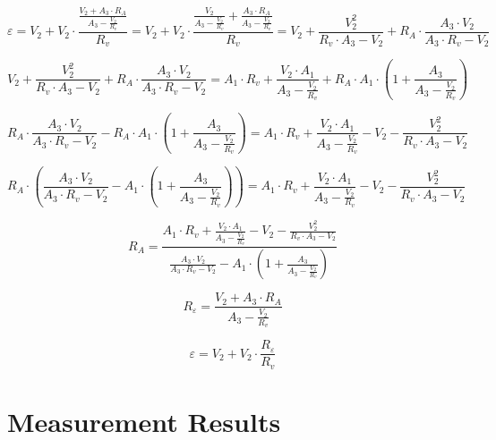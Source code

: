 \documentclass[12pt]{article}
\begin{document}
    \begin{equation*}
        \varepsilon = V_2 + V_2 \cdot \frac{\frac{V_2 + A_3 \cdot R_A}{A_3 - \frac{V_2}{R_v}}}{R_v} = V_2 + V_2 \cdot \frac{\frac{V_2}{A_3 - \frac{V_2}{R_v}} + \frac{A_3 \cdot R_A}{A_3 - \frac{V_2}{R_v}}}{R_v} = V_2 + \frac{V_2^2}{R_v \cdot A_3 - V_2} + R_A \cdot \frac{A_3 \cdot V_2}{A_3 \cdot R_v - V_2}
    \end{equation*}

    \begin{equation*}
        V_2 + \frac{V_2^2}{R_v \cdot A_3 - V_2} + R_A \cdot \frac{A_3 \cdot V_2}{A_3 \cdot R_v - V_2} = A_1 \cdot R_v + \frac{V_2 \cdot A_1}{A_3 - \frac{V_2}{R_v}} + R_A \cdot A_1 \cdot \left( 1 + \frac{A_3}{A_3 - \frac{V_2}{R_v}} \right)
    \end{equation*}

    \begin{equation*}
        R_A \cdot \frac{A_3 \cdot V_2}{A_3 \cdot R_v - V_2} - R_A \cdot A_1 \cdot \left( 1 + \frac{A_3}{A_3 - \frac{V_2}{R_v}} \right) = A_1 \cdot R_v + \frac{V_2 \cdot A_1}{A_3 - \frac{V_2}{R_v}} - V_2 - \frac{V_2^2}{R_v \cdot A_3 - V_2}
    \end{equation*}

    \begin{equation*}
        R_A \cdot \left( \frac{A_3 \cdot V_2}{A_3 \cdot R_v - V_2} - A_1 \cdot \left( 1 + \frac{A_3}{A_3 - \frac{V_2}{R_v}} \right) \right) = A_1 \cdot R_v + \frac{V_2 \cdot A_1}{A_3 - \frac{V_2}{R_v}} - V_2 - \frac{V_2^2}{R_v \cdot A_3 - V_2}
    \end{equation*}

    \begin{equation*}
        R_A = \frac{A_1 \cdot R_v + \frac{V_2 \cdot A_1}{A_3 - \frac{V_2}{R_v}} - V_2 - \frac{V_2^2}{R_v \cdot A_3 - V_2}}{\frac{A_3 \cdot V_2}{A_3 \cdot R_v - V_2} - A_1 \cdot \left( 1 + \frac{A_3}{A_3 - \frac{V_2}{R_v}} \right)}
    \end{equation*}

    \begin{equation*}
        R_\varepsilon = \frac{V_2 + A_3 \cdot R_A}{A_3 - \frac{V_2}{R_v}}
    \end{equation*}

    \begin{equation*}
        \varepsilon = V_2 + V_2 \cdot \frac{R_\varepsilon}{R_v}
    \end{equation*}




    \section{Measurement Results}\label{sec:measurement-results}
\end{document}
